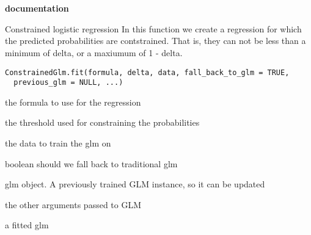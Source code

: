 \documentclass[a4paper]{book}
\begin{document}
\chapter*{}
\begin{center}
{\textbf{\huge \R{} documentation}} \par{}
\par\bigskip{\large \today}
\end{center}
%
\begin{Description}\relax
Constrained logistic regression
In this function we create a regression for which the predicted
probabilities are contstrained. That is, they can not be less than a minimum
of delta, or a maxiumum of 1 - delta.
\end{Description}
%
\begin{Usage}
\begin{verbatim}
ConstrainedGlm.fit(formula, delta, data, fall_back_to_glm = TRUE,
  previous_glm = NULL, ...)
\end{verbatim}
\end{Usage}
%
\begin{Arguments}
\begin{ldescription}
\item[\code{formula}] the formula to use for the regression

\item[\code{delta}] the threshold used for constraining the probabilities

\item[\code{data}] the data to train the glm on

\item[\code{fall\_back\_to\_glm}] boolean should we fall back to traditional glm

\item[\code{previous\_glm}] glm object. A previously trained GLM instance, so it can be updated

\item[\code{...}] the other arguments passed to GLM
\end{ldescription}
\end{Arguments}
%
\begin{Value}
a fitted glm
\end{Value}
\end{document}
